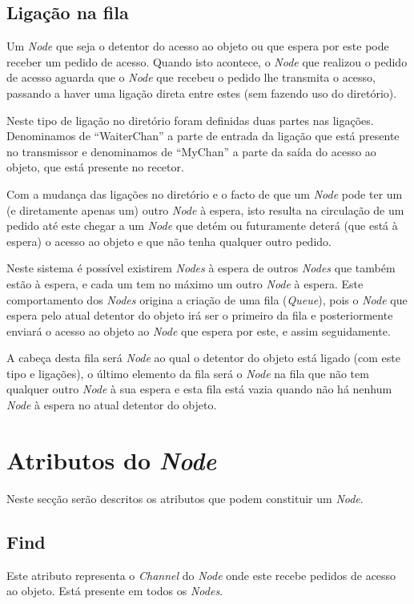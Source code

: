 
\subsection*{Ligação na fila}
Um \emph{Node} que seja o detentor do acesso ao objeto ou que espera por este pode receber um pedido de acesso. Quando isto acontece, o \emph{Node} que realizou o pedido de acesso aguarda que o \emph{Node} que recebeu o pedido lhe transmita o acesso, passando a haver uma ligação direta entre estes (sem fazendo uso do diretório).

Neste tipo de ligação no diretório foram definidas duas partes nas ligações. Denominamos de  ``WaiterChan'' a parte de entrada da ligação que está presente no transmissor e denominamos de ``MyChan'' a parte da saída do acesso ao objeto, que está presente no recetor.

Com a mudança das ligações no diretório e o facto de que um \emph{Node} pode ter um (e diretamente apenas um) outro \emph{Node} à espera, isto resulta na circulação de um pedido até este chegar a um \emph{Node} que detém ou futuramente deterá (que está à espera) o acesso ao objeto e que não tenha qualquer outro pedido.

Neste sistema é possível existirem \emph{Nodes} à espera de outros \emph{Nodes} que também estão à espera, e cada um tem no máximo um outro \emph{Node} à espera. 
Este comportamento dos \emph{Nodes} origina a criação de uma fila (\emph{Queue}), pois o \emph{Node} que espera pelo atual detentor do objeto irá ser o primeiro da fila e posteriormente enviará o acesso ao objeto ao \emph{Node} que espera por este, e assim seguidamente.

A cabeça desta fila será \emph{Node} ao qual o detentor do objeto está ligado (com este tipo e ligações), o último elemento da fila será o \emph{Node} na fila que não tem qualquer outro \emph{Node} à sua espera e esta fila está vazia quando não há nenhum \emph{Node} à espera no atual detentor do objeto.


\section{Atributos do \emph{Node}}
\label{especificacao:atr:section}
Neste secção serão descritos os atributos que podem constituir um \emph{Node}.

\subsection*{Find}
\label{especificacao:atr:Find}
    Este atributo representa o \emph{Channel} do \emph{Node} onde este recebe pedidos de acesso ao objeto.
    Está presente em todos os \emph{Nodes}.

